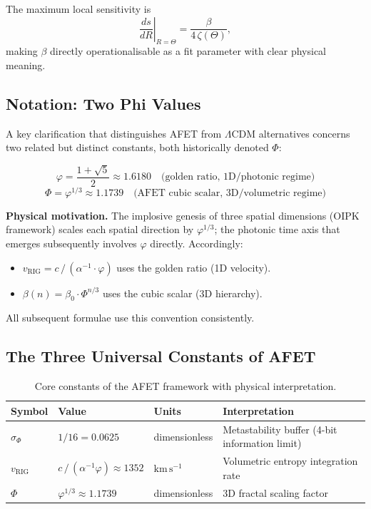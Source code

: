 \documentclass[12pt,a4paper]{article}
\theoremstyle{definition}
\newcommand{\sigphi}{\sigma_{\Phi}}
\newcommand{\vrig}{v_{\mathrm{RIG}}}
\newcommand{\phigold}{\varphi}   %
\newcommand{\PhiAFET}{\Phi}      %
\begin{document}
The maximum local sensitivity is
\begin{equation}
  \left.\frac{ds}{dR}\right|_{R=\Theta} = \frac{\beta}{4\,\zeta(\Theta)},
\end{equation}
making $\beta$ directly operationalisable as a fit parameter with clear physical meaning.

\subsection{Notation: Two Phi Values}

A key clarification that distinguishes AFET from $\Lambda$CDM alternatives
concerns two related but distinct constants, both historically denoted $\Phi$:

\begin{equation}
  \phigold = \frac{1+\sqrt{5}}{2} \approx 1.6180\quad\text{(golden ratio, 1D/photonic regime)}
\end{equation}
\begin{equation}
  \PhiAFET = \phigold^{1/3} \approx 1.1739\quad\text{(AFET cubic scalar, 3D/volumetric regime)}
\end{equation}

\textbf{Physical motivation.}
The implosive genesis of three spatial dimensions (OIPK framework) scales each spatial
direction by $\phigold^{1/3}$; the photonic time axis that emerges subsequently
involves $\phigold$ directly.
Accordingly:
\begin{itemize}[leftmargin=1.8em]
  \item $\vrig = c\,/\,(\alpha^{-1}\cdot\phigold)$ uses the golden ratio (1D velocity).
  \item $\beta(n) = \beta_0 \cdot \PhiAFET^{n/3}$ uses the cubic scalar (3D hierarchy).
\end{itemize}
All subsequent formulae use this convention consistently.

\subsection{The Three Universal Constants of AFET}

\begin{table}[h]
\centering
\caption{Core constants of the AFET framework with physical interpretation.}
\label{tab:constants}
\begin{tabular}{llll}
\toprule
\textbf{Symbol} & \textbf{Value} & \textbf{Units} & \textbf{Interpretation} \\
\midrule
$\sigphi$ & $1/16 = 0.0625$ & dimensionless &
  Metastability buffer (4-bit information limit) \\
$\vrig$ & $c\,/\,(\alpha^{-1}\phigold) \approx 1352$ & $\mathrm{km\,s^{-1}}$ &
  Volumetric entropy integration rate \\
$\PhiAFET$ & $\phigold^{1/3} \approx 1.1739$ & dimensionless &
  3D fractal scaling factor \\
\bottomrule
\end{tabular}
\end{table}
\end{document}
